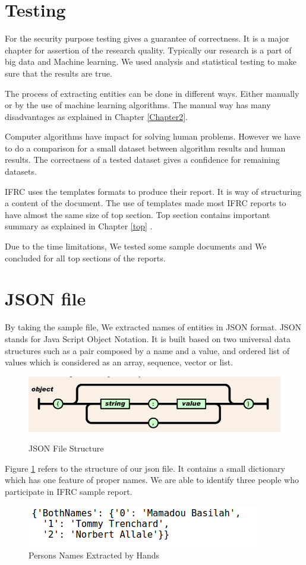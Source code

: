 \newpage
\section{Testing}\label{chp4}
For the security purpose testing gives a guarantee of correctness.  It is a major chapter for assertion of the research quality. Typically our research is a part of big data and Machine learning. We used analysis and statistical testing to make sure that the results are true.

The process of extracting entities can be done in different ways. Either manually or by the use of machine learning algorithms. The manual way has many disadvantages as explained in Chapter \ref{Chapter2}.

Computer algorithms have impact for solving human problems. However we have to do a comparison for a small dataset between algorithm results and human results. The correctness of a tested dataset gives a confidence for remaining datasets.

IFRC uses the templates formats to produce their report. It is way of structuring a content of the document. The use of templates made most IFRC reports to have almost  the same size of top section. Top section contains important summary  as explained in Chapter \ref{top} .

Due to the time limitations, We tested  some  sample documents and We concluded for all top sections of the reports.
\section*{JSON file }
By taking the sample file, We extracted names of entities in JSON format. JSON stands for Java Script Object Notation. It is built based on two universal data structures such as a pair composed by a name and a value, and ordered list of values which is considered as an array, sequence, vector or list.
\begin{figure}[hbtp]
\caption{JSON File Structure}
\centering
\includegraphics[scale=.7]{images/json.png}\label{json}
\end{figure}


Figure \ref{json} refers to the structure of our json file. It contains a small dictionary which has one feature of proper names. We are able to identify three people who participate in IFRC sample report.
\newpage 
\begin{figure}[hbtp]
\centering
\includegraphics[scale=.7]{images/BothNames.png}
\caption{Persons Names Extracted by Hands}\label{Hand}
\end{figure}

